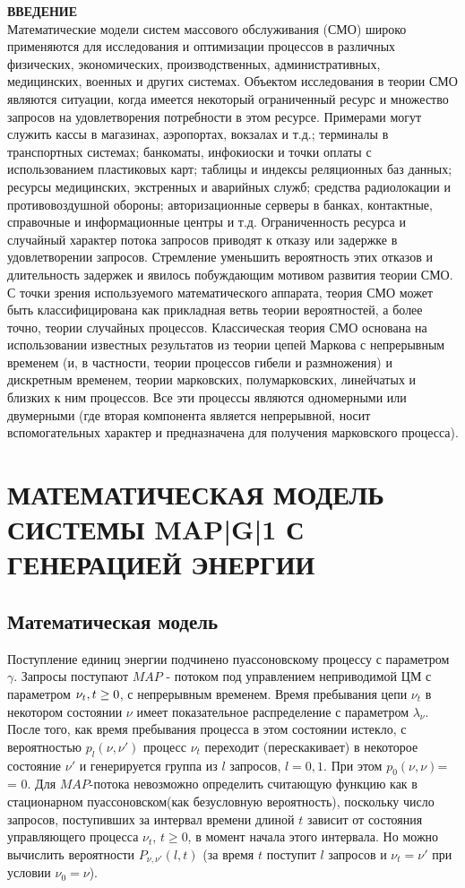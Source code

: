 \documentclass[12pt, a4paper]{article}
\begin{document}
\newpage
	\large
	\textbf{ВВЕДЕНИЕ}\\
	Математические модели систем массового обслуживания (СМО) широко применяются для исследования и оптимизации процессов в различных физических, экономических, производственных, административных, медицинских, военных и других системах. Объектом исследования в теории СМО являются ситуации, когда имеется некоторый ограниченный ресурс и множество запросов на удовлетворения потребности в этом ресурсе. Примерами могут служить кассы в магазинах, аэропортах, вокзалах и т.д.; терминалы в транспортных системах; банкоматы, инфокиоски и точки оплаты с использованием пластиковых карт; таблицы и индексы реляционных баз данных; ресурсы медицинских, экстренных и аварийных служб; средства радиолокации и противовоздушной обороны; авторизационные серверы в банках, контактные, справочные и информационные центры и т.д. Ограниченность ресурса и случайный характер потока запросов приводят к отказу или задержке в удовлетворении запросов. Стремление уменьшить вероятность этих отказов и длительность задержек и явилось побуждающим мотивом развития теории СМО. С точки зрения используемого математического аппарата, теория СМО может быть классифицирована как прикладная ветвь теории вероятностей, а более точно, теории случайных процессов. Классическая теория СМО основана на использовании известных результатов из теории цепей Маркова с непрерывным временем (и, в частности, теории процессов гибели и размножения) и дискретным временем, теории марковских, полумарковских, линейчатых и близких к ним процессов. Все эти процессы являются одномерными или двумерными (где вторая компонента является непрерывной, носит вспомогательных характер и предназначена для получения марковского процесса).
	
	\section{МАТЕМАТИЧЕСКАЯ МОДЕЛЬ СИСТЕМЫ MAP|G|1 С ГЕНЕРАЦИЕЙ ЭНЕРГИИ}
	\subsection{Математическая модель}
	Поступление единиц энергии подчинено пуассоновскому
	процессу с параметром $\gamma$. Запросы поступают $MAP$ - потоком под управлением
	неприводимой ЦМ с параметром $\nu_{t},\\ t\geq 0$, с непрерывным временем. Время пребывания цепи $\nu_{t}$ в
	некотором состоянии $\nu$ имеет показательное распределение с параметром
	$\lambda_{\nu}$. После того, как время пребывания процесса в этом состоянии
	истекло, с вероятностью $p_{l}(\nu, \nu')$ процесс $\nu_{t}$ переходит (перескакивает) в
	некоторое состояние $\nu'$ и генерируется группа из $l$ запросов, $l =0, 1$. При
	этом $p_{0}(\nu, \nu)$= = 0. Для $MAP$-потока невозможно определить считающую функцию как в стационарном пуассоновском(как безусловную вероятность), поскольку число запросов, поступивших за интервал времени длиной $t$ зависит от состояния управляющего
	процесса $\nu_{t}$, $t\geq $0, в момент начала этого интервала. Но можно вычислить
	вероятности $P_{\nu, \nu'}(l , t)$
	(за время $t$ поступит $l$ запросов и $\nu_{t} = \nu'$ при условии $\nu_{0} = \nu$).
\end{document}
